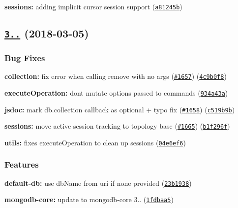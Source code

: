 \begin{DoxyItemize}
\item {\bfseries sessions\+:} adding implicit cursor session support (\href{https://github.com/mongodb/node-mongodb-native/commit/a81245b}{\tt a81245b})
\end{DoxyItemize}

\label{_3.0.4}%
 \subsection*{\href{https://github.com/mongodb/node-mongodb-native/compare/v3.0.2...v3.0.4}{\tt 3..} (2018-\/03-\/05)}

\subsubsection*{Bug Fixes}


\begin{DoxyItemize}
\item {\bfseries collection\+:} fix error when calling remove with no args (\href{https://github.com/mongodb/node-mongodb-native/issues/1657}{\tt \#1657}) (\href{https://github.com/mongodb/node-mongodb-native/commit/4c9b0f8}{\tt 4c9b0f8})
\item {\bfseries execute\+Operation\+:} don\textquotesingle{}t mutate options passed to commands (\href{https://github.com/mongodb/node-mongodb-native/commit/934a43a}{\tt 934a43a})
\item {\bfseries jsdoc\+:} mark db.\+collection callback as optional + typo fix (\href{https://github.com/mongodb/node-mongodb-native/issues/1658}{\tt \#1658}) (\href{https://github.com/mongodb/node-mongodb-native/commit/c519b9b}{\tt c519b9b})
\item {\bfseries sessions\+:} move active session tracking to topology base (\href{https://github.com/mongodb/node-mongodb-native/issues/1665}{\tt \#1665}) (\href{https://github.com/mongodb/node-mongodb-native/commit/b1f296f}{\tt b1f296f})
\item {\bfseries utils\+:} fixes execute\+Operation to clean up sessions (\href{https://github.com/mongodb/node-mongodb-native/commit/04e6ef6}{\tt 04e6ef6})
\end{DoxyItemize}

\subsubsection*{Features}


\begin{DoxyItemize}
\item {\bfseries default-\/db\+:} use db\+Name from uri if none provided (\href{https://github.com/mongodb/node-mongodb-native/commit/23b1938}{\tt 23b1938})
\item {\bfseries mongodb-\/core\+:} update to mongodb-\/core 3.. (\href{https://github.com/mongodb/node-mongodb-native/commit/1fdbaa5}{\tt 1fdbaa5})
\end{DoxyItemize}

